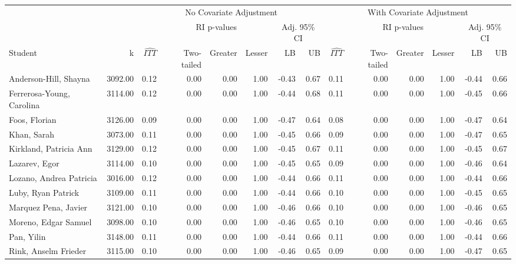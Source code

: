 \documentclass[11pt,notitlepage]{article}
\begin{document}
\begin{table}[h!]\scriptsize\onehalfspacing
\begin{center}
\begin{tabular}{lrrrrrrr|rrrrrr}
  \hline
  & & \multicolumn{6}{c|}{No Covariate Adjustment} & \multicolumn{6}{c}{With Covariate Adjustment} \\
  \cline{3-14}
  & & & \multicolumn{3}{c}{RI p-values} & \multicolumn{2}{c|}{Adj. 95\% CI} &  & \multicolumn{3}{c}{RI p-values} & \multicolumn{2}{c}{Adj. 95\% CI} \\
  \cline{4-6}\cline{10-12}
Student & k & $\widehat{ITT}$ & Two-tailed & Greater & Lesser & LB & UB & $\widehat{ITT}$ & Two-tailed & Greater & Lesser & LB & UB \\ 
  \hline
Anderson-Hill, Shayna & 3092.00 & 0.12 & 0.00 & 0.00 & 1.00 & -0.43 & 0.67 & 0.11 & 0.00 & 0.00 & 1.00 & -0.44 & 0.66 \\ 
  Ferrerosa-Young, Carolina & 3114.00 & 0.12 & 0.00 & 0.00 & 1.00 & -0.44 & 0.68 & 0.11 & 0.00 & 0.00 & 1.00 & -0.45 & 0.66 \\ 
  Foos, Florian & 3126.00 & 0.09 & 0.00 & 0.00 & 1.00 & -0.47 & 0.64 & 0.08 & 0.00 & 0.00 & 1.00 & -0.47 & 0.64 \\ 
  Khan, Sarah & 3073.00 & 0.11 & 0.00 & 0.00 & 1.00 & -0.45 & 0.66 & 0.09 & 0.00 & 0.00 & 1.00 & -0.47 & 0.65 \\ 
  Kirkland, Patricia Ann & 3129.00 & 0.12 & 0.00 & 0.00 & 1.00 & -0.45 & 0.67 & 0.11 & 0.00 & 0.00 & 1.00 & -0.45 & 0.67 \\ 
  Lazarev, Egor & 3114.00 & 0.10 & 0.00 & 0.00 & 1.00 & -0.45 & 0.65 & 0.09 & 0.00 & 0.00 & 1.00 & -0.46 & 0.64 \\ 
  Lozano, Andrea Patricia & 3016.00 & 0.12 & 0.00 & 0.00 & 1.00 & -0.44 & 0.66 & 0.11 & 0.00 & 0.00 & 1.00 & -0.44 & 0.66 \\ 
  Luby, Ryan Patrick & 3109.00 & 0.11 & 0.00 & 0.00 & 1.00 & -0.44 & 0.66 & 0.10 & 0.00 & 0.00 & 1.00 & -0.45 & 0.65 \\ 
  Marquez Pena, Javier & 3121.00 & 0.10 & 0.00 & 0.00 & 1.00 & -0.46 & 0.66 & 0.10 & 0.00 & 0.00 & 1.00 & -0.46 & 0.65 \\ 
  Moreno, Edgar Samuel & 3098.00 & 0.10 & 0.00 & 0.00 & 1.00 & -0.46 & 0.65 & 0.10 & 0.00 & 0.00 & 1.00 & -0.46 & 0.65 \\ 
  Pan, Yilin & 3148.00 & 0.11 & 0.00 & 0.00 & 1.00 & -0.44 & 0.66 & 0.11 & 0.00 & 0.00 & 1.00 & -0.44 & 0.66 \\ 
  Rink, Anselm Frieder & 3115.00 & 0.10 & 0.00 & 0.00 & 1.00 & -0.46 & 0.65 & 0.09 & 0.00 & 0.00 & 1.00 & -0.47 & 0.65 \\ 

\end{tabular}
\end{center}
\end{table}
\end{document}

